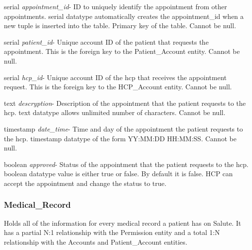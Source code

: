 \documentclass[10pt]{report}
\begin{document}
\begin{description}
\item serial \textit{appointment\_id}- ID to uniquely identify the appointment from other appointments. serial datatype automatically creates the appointment\_id when a new tuple is inserted into the table.  Primary key of the table.  Cannot be null.
\item serial \textit{patient\_id}-  Unique account ID of the patient that requests the appointment.  This is the foreign key to the Patient\_Account entity.  Cannot be null.
\item serial \textit{hcp\_id}- Unique account ID of the hcp that receives the appointment request.  This is the foreign key to the HCP\_Account entity.  Cannot be null.
\item text \textit{descryption}- Description of the appointment that the patient requests to the hcp.  text datatype allows unlimited number of characters.  Cannot be null.
\item timestamp \textit{date\_time}- Time and day of the appointment the patient requests to the hcp.  timestamp datatype of the form YY:MM:DD HH:MM:SS.  Cannot be null.
\item boolean \textit{approved}- Status of the appointment that the patient requests to the hcp.  boolean datatype value is either true or false.  By default it is false.  HCP can accept the appointment and change the status to true.
\end{description}

\subsubsection{Medical\_Record}
Holds all of the information for every medical record a patient has on Salute.  It has a partial N:1 relationship with the Permission entity and a total 1:N relationship with the Accounts and Patient\_Account entities.
\end{document}
